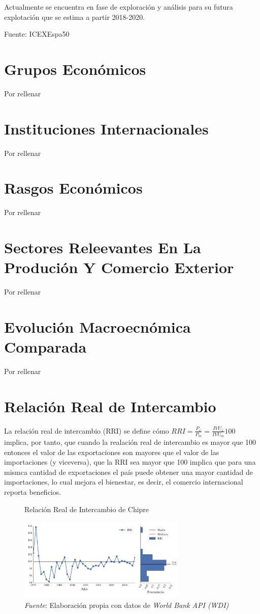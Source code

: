 \documentclass[a4paper,openright,12pt]{book}
\begin{document}
\*Actualmente se encuentra en fase de exploración y análisis para su futura explotación que se estima a partir 2018-2020.

Fuente: ICEXEspa50

\section{Grupos Económicos}
Por rellenar

\section{Instituciones Internacionales}

Por rellenar

\section{Rasgos Económicos}

Por rellenar

\section{Sectores Releevantes En La Produción Y Comercio Exterior}

Por rellenar

\section{Evolución Macroecnómica Comparada}

Por rellenar

\section{Relación Real de Intercambio}

La relación real de intercambio (RRI) se define cómo $RRI = \frac{P_x}{P_m} = \frac{IVU_x}{IVU_m} 100$ implica, por tanto, que cuando la realación real de intercambio es mayor que 100 entonces el valor de las exportaciones son mayores que el valor de las importaciones (y viceversa), que la RRI sea mayor que 100 implica que para una mismca cantidad de exportaciones el país puede obtener una mayor cantidad de importaciones, lo cual mejora el bienestar, es decir, el comercio internacional reporta beneficios.

\begin{figure}[ht]
    \centering
    \caption{Relación Real de Intercambio de Chipre}
    \includegraphics[width=300px]{rri_0}
    \caption*{\textit{Fuente}: Elaboración propia con datos de \textit{World Bank API (WDI)}}
    \label{rri}
\end{figure}
\end{document}
